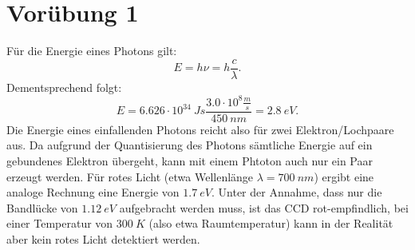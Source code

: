\documentclass[titlepage]{scrartcl}
\begin{document}
\section{Vorübung 1}
Für die Energie eines Photons gilt: 
\begin{equation}
E = h \nu = h \frac{c}{\lambda}. 
\end{equation}
Dementsprechend folgt: 
\begin{equation}
E = 6.626 \cdot 10^{34}\ Js \frac{3.0 \cdot 10^8 \frac{m}{s}}{450\ nm} = 2.8\ eV. 
\end{equation}
Die Energie eines einfallenden Photons reicht also für zwei Elektron/Lochpaare aus. 	Da aufgrund der Quantisierung des Photons sämtliche Energie auf ein gebundenes Elektron übergeht, kann mit einem Phtoton auch nur ein Paar erzeugt werden. 
Für rotes Licht (etwa Wellenlänge $\lambda = 700\ nm $) ergibt eine analoge Rechnung eine Energie von $1.7\ eV $. Unter der Annahme, dass nur die Bandlücke von $1.12\ eV $ aufgebracht werden muss, ist das CCD rot-empfindlich, bei einer Temperatur von $ 300\ K $ (also etwa Raumtemperatur) kann in der Realität aber kein rotes Licht detektiert werden. 
\end{document}
